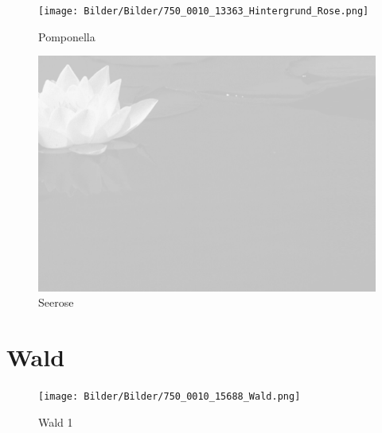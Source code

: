 \documentclass[ngerman,a4paper,11pt]{scrreprt}
\begin{document}
\begin{figure}[H]
\centering
\texttt{[image: Bilder/Bilder/750\_0010\_13363\_Hintergrund\_Rose.png]}
\caption{Pomponella}
\end{figure}

\begin{figure}[H]
\centering
\includegraphics[width=\textwidth,height=.8\textheight]{Bilder/Bilder/750_0010_13964_1070679_Hintergrund_mit_Seerose.png}
\caption{Seerose}
\end{figure}

\chapter{Wald}
\label{sec-3-3}

\begin{figure}[H]
\centering
\texttt{[image: Bilder/Bilder/750\_0010\_15688\_Wald.png]}
\caption{Wald 1}
\end{figure}
\end{document}
